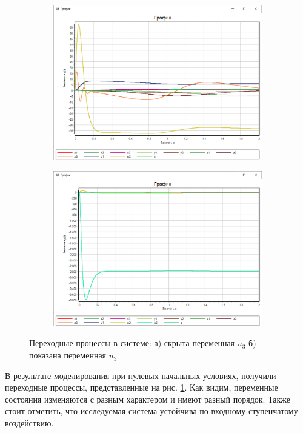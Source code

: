 	\begin{figure}[!h]
		\begin{subfigure}{.5\textwidth}
			\centering\includegraphics[width=.95\textwidth]{png/graph1.1.png}
			\caption{}
		\end{subfigure}
		\begin{subfigure}{.5\textwidth}
			\centering\includegraphics[width=.95\textwidth]{png/graph1.2.png}
			\caption{}
		\end{subfigure}
		\caption{Переходные процессы в системе: а) скрыта переменная $u_3$ б) показана переменная $u_3$}
		\label{graph1} 
	\end{figure}
	
	В результате моделирования при нулевых начальных условиях, получили переходные процессы, представленные на рис. \ref{graph1}. Как видим, переменные состояния изменяются с разным характером и имеют разный порядок. Также стоит отметить, что исследуемая система устойчива по входному ступенчатому воздействию.
	
